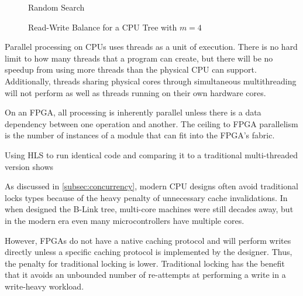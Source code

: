 \begin{figure}[H]
	\centering
	
	\caption{Random Search}
	\label{fig:cpu-random-search}
\end{figure}



\begin{figure}[H]
	\centering
	
	\caption{Read-Write Balance for a CPU Tree with $m=4$}
	\label{fig:rw-balance}
\end{figure}



Parallel processing on CPUs uses threads as a unit of execution. There is no
hard limit to how many threads that a program can create, but there will be no
speedup from using more threads than the physical CPU can support. Additionally,
threads sharing physical cores through simultaneous multithreading will not
perform as well as threads running on their own hardware cores.

On an FPGA, all processing is inherently parallel unless there is a data
dependency between one operation and another. The ceiling to FPGA parallelism is
the number of instances of a module that can fit into the FPGA's fabric.

Using HLS to run identical code and comparing it to a traditional multi-threaded
version shows \todo{\ldots}



As discussed in \autoref{subsec:concurrency}, modern CPU designs often avoid
traditional locks types because of the heavy penalty of unnecessary cache
invalidations. In \citeyear{b-link} when \citeauthor{b-link} designed the B-Link
tree, multi-core machines were still decades away, but in the modern era even
many microcontrollers have multiple cores.

However, FPGAs do not have a native caching protocol and will perform writes
directly unless a specific caching protocol is implemented by the designer.
Thus, the penalty for traditional locking is lower. Traditional locking has the
benefit that it avoids an unbounded number of re-attempts at performing a write
in a write-heavy workload.




